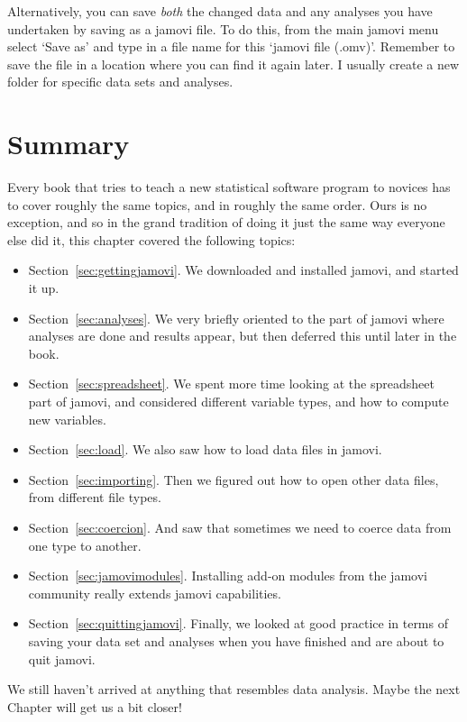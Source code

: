 Alternatively, you can save {\it both} the changed data and any analyses you have undertaken by saving as a jamovi file. To do this, from the main jamovi menu select `Save as' and type in a file name for this `jamovi file (.omv)'. Remember to save the file in a location where you can find it again later. I usually create a new folder for specific data sets and analyses.  


\section{Summary}

Every book that tries to teach a new statistical software program to novices has to cover roughly the same topics, and in roughly the same order. Ours is no exception, and so in the grand tradition of doing it just the same way everyone else did it, this chapter covered the following topics:

\begin{itemize}
\item Section~\ref{sec:gettingjamovi}. We downloaded and installed jamovi, and started it up.
\item Section~\ref{sec:analyses}. We very briefly oriented to the part of jamovi where analyses are done and results appear, but then deferred this until later in the book.
\item Section~\ref{sec:spreadsheet}. We spent more time looking at the spreadsheet part of jamovi, and considered different variable types, and how to compute new variables.
\item Section~\ref{sec:load}. We also saw how to load data files in jamovi.
\item Section~\ref{sec:importing}. Then we figured out how to open other data files, from different file types.
\item Section~\ref{sec:coercion}. And saw that sometimes we need to coerce data from one type to another.
\item Section~\ref{sec:jamovimodules}. Installing add-on modules from the jamovi community really extends jamovi capabilities.
\item Section~\ref{sec:quittingjamovi}. Finally, we looked at good practice in terms of saving your data set and analyses when you have finished and are about to quit jamovi.
\end{itemize}

\noindent
We still haven't arrived at anything that resembles data analysis. Maybe the next Chapter will get us a bit closer!



